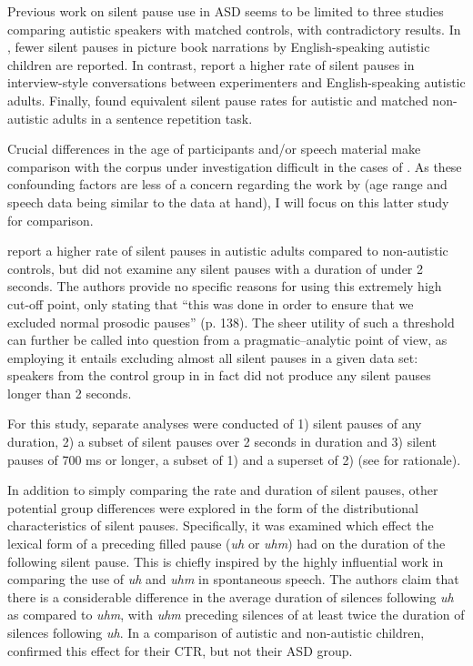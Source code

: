 Previous work on silent pause use in ASD seems to be limited to three studies comparing autistic speakers with matched controls, with contradictory results. In \citet{thurberPausesNarrativesProduced1993}, fewer silent pauses in picture book narrations by English-speaking autistic children are reported. In contrast, \citet{lakeListenerVsSpeakeroriented2011} report a higher rate of silent pauses in interview-style conversations between experimenters and English-speaking autistic adults. Finally, \citet{engelhardtSpeakerVersusListenerOrientedDisfluency2017} found equivalent silent pause rates for autistic and matched non-autistic adults in  a sentence repetition task.

 Crucial differences in the age of participants and/or speech material make comparison with the corpus under investigation difficult in the cases of \citet{thurberPausesNarrativesProduced1993,engelhardtSpeakerVersusListenerOrientedDisfluency2017}. As these confounding factors are less of a concern regarding the work by \citet{lakeListenerVsSpeakeroriented2011} (age range and speech data being similar to the data at hand), I will focus on this latter study for comparison. 
 
\citet{lakeListenerVsSpeakeroriented2011} report a higher rate of silent pauses in autistic adults compared to non-autistic controls, but did not examine any silent pauses with a duration of under 2 seconds. The authors provide no specific reasons for using this extremely high cut-off point, only stating that ``this was done in order to ensure that we excluded normal prosodic pauses” (p. 138). The sheer utility of such a threshold can further be called into question from a pragmatic--analytic point of view, as employing it entails excluding almost all silent pauses in a given data set: speakers from the control group in \citet{lakeListenerVsSpeakeroriented2011} in fact did not produce any silent pauses longer than 2 seconds.

For this study, separate analyses were conducted of 1) silent pauses of any duration, 2) a subset of silent pauses over 2 seconds in duration \citep[for comparison with][]{lakeListenerVsSpeakeroriented2011} and 3) silent pauses of 700 ms or longer, a subset of 1) and a superset of 2) (see  for rationale). 

In addition to simply comparing the rate and duration of silent pauses, other potential group differences were explored in the form of the distributional characteristics of silent pauses. Specifically, it was examined which effect the lexical form of a preceding filled pause (\textit{uh} or \textit{uhm}) had on the duration of the following silent pause. 
This is chiefly inspired by the highly influential work in \citet{clarkUsingUhUm2002} comparing the use of \emph{uh} and \emph{uhm} in spontaneous speech. The authors claim that there is a considerable difference in the average duration of silences following \emph{uh} as compared to \emph{uhm}, with \emph{uhm} preceding silences of at least twice the duration of silences following \emph{uh}. In a comparison of autistic and non-autistic children, \citet{lunsfordAutismUseFillers2010} confirmed this effect for their CTR, but not their ASD group. 

